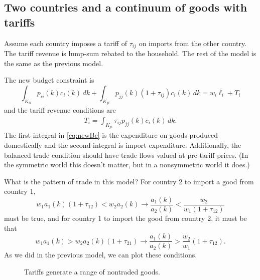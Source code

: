 \documentclass[11pt, pdftex]{article}
\begin{document}
\subsection*{Two countries and a continuum of goods with tariffs}
Assume each country imposes a tariff of $\tau_{ij}$ on imports from the other country.  The tariff revenue is lump-sum rebated to the household.  The rest of the model is the same as the previous model.

The new budget constraint is
\begin{equation}\label{eq:newBc}
  \int_{K_{ii}} \!\! p_{ii}(k) c_i(k) \, dk + \int_{K_{ji}} \!\! p_{jj}(k)(1+\tau_{ij}) c_i(k) \, dk= w_i \bar{\ell_i} + T_i
\end{equation}
and the tariff revenue conditions are
\begin{align}
  T_i = \int_{K_{ji}} \!\! \tau_{ij} p_{jj}(k) c_{i}(k) \, dk.
\end{align}
The first integral in \eqref{eq:newBc} is the expenditure on goods produced domestically and the second integral is import expenditure. Additionally, the balanced trade condition should have trade flows valued at pre-tariff prices.  (In the symmetric world this doesn't matter, but in a nonsymmetric world it does.)

What is the pattern of trade in this model?  For country 2 to import a good from country 1,
\begin{equation}\label{eq:cutoffTariff2}
 w_1 a_1(k) (1+\tau_{12}) < w_2 a_2(k) \rightarrow \frac{a_1(k)}{a_2(k)}<\frac{w_2}{w_1(1+\tau_{12})}
\end{equation}
must be true, and for country 1 to import the good from country 2, it must be that
\begin{equation}\label{eq:cutoffTariff1}
 w_1 a_1(k)  > w_2 a_2(k)(1+\tau_{21})\rightarrow \frac{a_1(k)}{a_2(k)}>\frac{w_2}{w_1}(1+\tau_{12}).
\end{equation}
As we did in the previous model, we can plot these conditions.
\begin{figure}[ht]
\caption{Tariffs generate a range of nontraded goods.}
\centering
{}
\end{figure}
\end{document}
